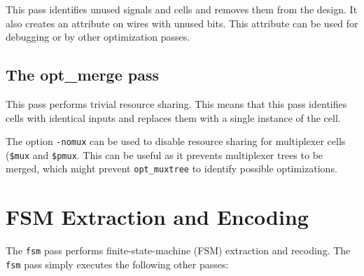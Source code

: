 This pass identifies unused signals and cells and removes them from the design. It also
creates an  attribute on wires with unused bits. This attribute can be
used for debugging or by other optimization passes.

\subsection{The opt\_merge pass}

This pass performs trivial resource sharing. This means that this pass identifies cells
with identical inputs and replaces them with a single instance of the cell.

The option {\tt -nomux} can be used to disable resource sharing for multiplexer
cells ({\tt \$mux} and {\tt \$pmux}. This can be useful as
it prevents multiplexer trees to be merged, which might prevent {\tt opt\_muxtree}
to identify possible optimizations.

\section{FSM Extraction and Encoding}

The {\tt fsm} pass performs finite-state-machine (FSM) extraction and recoding. The {\tt fsm}
pass simply executes the following other passes:

